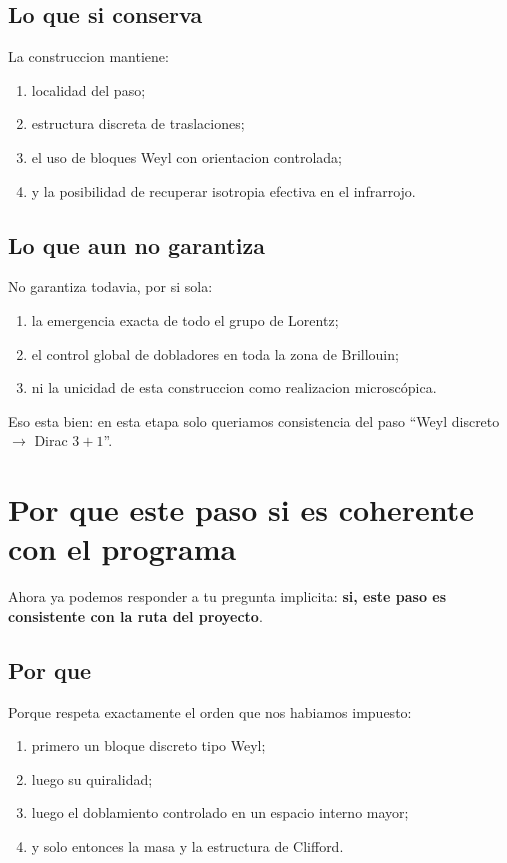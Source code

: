 \subsection{Lo que si conserva}
La construccion mantiene:
\begin{enumerate}[label=\arabic*.]
    \item localidad del paso;
    \item estructura discreta de traslaciones;
    \item el uso de bloques Weyl con orientacion controlada;
    \item y la posibilidad de recuperar isotropia efectiva en el infrarrojo.
\end{enumerate}

\subsection{Lo que aun no garantiza}
No garantiza todavia, por si sola:
\begin{enumerate}[label=\arabic*.]
    \item la emergencia exacta de todo el grupo de Lorentz;
    \item el control global de dobladores en toda la zona de Brillouin;
    \item ni la unicidad de esta construccion como realizacion microscópica.
\end{enumerate}

Eso esta bien: en esta etapa solo queriamos consistencia del paso \enquote{Weyl discreto \(\to\) Dirac \(3+1\)}.

\section{Por que este paso si es coherente con el programa}
Ahora ya podemos responder a tu pregunta implicita: \textbf{si, este paso es consistente con la ruta del proyecto}.

\subsection{Por que}
Porque respeta exactamente el orden que nos habiamos impuesto:
\begin{enumerate}[label=\arabic*.]
    \item primero un bloque discreto tipo Weyl;
    \item luego su quiralidad;
    \item luego el doblamiento controlado en un espacio interno mayor;
    \item y solo entonces la masa y la estructura de Clifford.
\end{enumerate}


